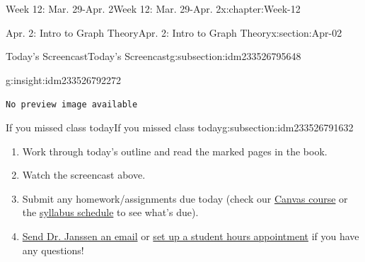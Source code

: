 \documentclass[oneside,10pt,]{book}
\newcommand{\mono}[1]{\texttt{#1}}
\numberwithin{equation}{section}
\newlength{\qrsize}
\newlength{\previewwidth}
\begin{document}
\begin{chapterptx}{Week 12: Mar. 29-Apr. 2}{}{Week 12: Mar. 29-Apr. 2}{}{}{x:chapter:Week-12}
\begin{sectionptx}{Apr. 2: Intro to Graph Theory}{}{Apr. 2: Intro to Graph Theory}{}{}{x:section:Apr-02}
%
%
\typeout{************************************************}
\typeout{************************************************}
%
\begin{subsectionptx}{Today's Screencast}{}{Today's Screencast}{}{}{g:subsection:idm233526795648}
\begin{insight}{}{g:insight:idm233526792272}%
\setlength{\qrsize}{9em}
\setlength{\previewwidth}{\linewidth}
\addtolength{\previewwidth}{-\qrsize}
\begin{tcbraster}[raster columns=2, raster column skip=1pt, raster halign=center, raster force size=false, raster left skip=0pt, raster right skip=0pt]%
\begin{tcolorbox}[previewstyle, width=\previewwidth]%
\mono{No preview image available}%
\end{tcolorbox}%
\begin{tcolorbox}[qrstyle]%
[QR LINK]\end{tcolorbox}%
\end{tcbraster}%
\end{insight}
\end{subsectionptx}
%
%
\typeout{************************************************}
\typeout{************************************************}
%
\begin{subsectionptx}{If you missed class today}{}{If you missed class today}{}{}{g:subsection:idm233526791632}
%
\begin{enumerate}
\item{}Work through today's outline and read the marked pages in the book.%
\item{}Watch the screencast above.%
\item{}Submit any homework\slash{}assignments due today (check our \href{https://dordt.instructure.com/courses/3110050}{Canvas course} or the \href{https://prof.mkjanssen.org/ds/index.html\#schedule}{syllabus schedule} to see what's due).%
\item{}\href{mailto:mike.janssen@dordt.edu}{Send Dr. Janssen an email} or \href{https://calendly.com/mkjanssen/student-hours}{set up a student hours appointment} if you have any questions!%
\end{enumerate}
\end{subsectionptx}
\end{sectionptx}
\end{chapterptx}
%
%
\typeout{************************************************}
\end{document}
